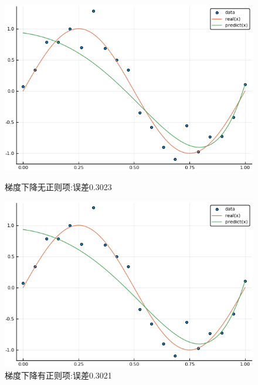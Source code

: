 \documentclass{ML}
\begin{document}
\begin{figure}[H]
	\begin{minipage}[c]{0.5\linewidth}
		\centering
		\includegraphics[width=0.9\linewidth]{media/20/SGDNoLambda}
		\caption{梯度下降无正则项:误差0.3023} %
		\label{fig:sgdnolambda20}
	\end{minipage}
	\begin{minipage}[c]{0.5\linewidth}
		\centering
		\includegraphics[width=0.9\linewidth]{media/20/SGDWithLambda}
		\caption{梯度下降有正则项:误差0.3021} %
		\label{fig:sgdwithlambda20}
	\end{minipage}
\end{figure}
\end{document}
